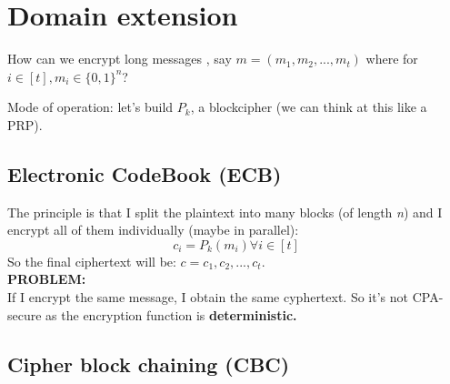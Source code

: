 \section{Domain extension}

How can we encrypt long messages , say $m=(m_{1}, m_{2}, ..., m_{t})$ where for $i \in [t], m_{i} \in \{0,1\}^{n} $?

Mode of operation: let's build $P_{k}$, a blockcipher (we can think at this like a PRP).

\subsection{Electronic CodeBook (ECB)}

The principle is that I split the plaintext into many blocks (of length \textit{n}) and I encrypt all of them individually (maybe in parallel):
\[
    c_{i}=P_{k}(m_{i}) \forall i \in [t]
\]
So the final ciphertext will be: $c=c_{1}, c_{2}, ..., c_{t}$.\\

\textbf{PROBLEM:}\\
If I encrypt the same message, I obtain the same cyphertext. So it's not
CPA-secure as the encryption function is \textbf{deterministic.}

\subsection{Cipher block chaining (CBC)}

